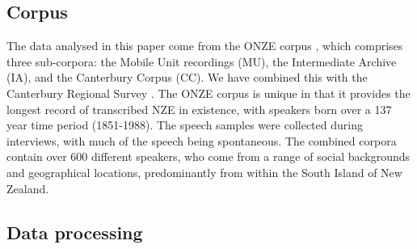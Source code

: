 \documentclass[review]{elsarticle} %
\begin{document}




\subsection{Corpus}
\label{sec:methods_corpus}

The data analysed in this paper come from the ONZE corpus \citep{gordon2007onze}, which comprises three sub-corpora: the Mobile Unit recordings (MU), the Intermediate Archive (IA), and the Canterbury Corpus (CC). We have combined this with the Canterbury Regional Survey \citep{darcy2017discourse}. The ONZE corpus is unique in that it provides the longest record of transcribed NZE in existence, with speakers born over a 137 year time period (1851-1988). The speech samples were collected during interviews, with much of the speech being spontaneous. The combined corpora contain over 600 different speakers, who come from a range of social backgrounds and geographical locations, predominantly from within the South Island of New Zealand. 

\subsection{Data processing}
\label{sec:methods_processing}
\end{document}

